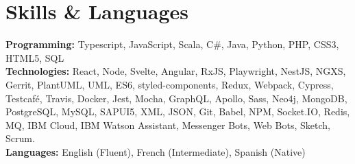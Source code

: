\documentclass[letterpaper,11pt]{article}
\newcommand{\resumeSubHeadingListStart}{\begin{itemize}[leftmargin=0.15pt, label={}]}
\newcommand{\resumeSubHeadingListEnd}{\end{itemize}}
\begin{document}
\section{Skills \& Languages}
  \vspace{2pt}
  \resumeSubHeadingListStart
    \small{\item{
        \textbf{Programming:}{ Typescript, JavaScript, Scala, C\#, Java, Python, PHP, CSS3, HTML5, SQL} \\ \vspace{3pt}
        \textbf{Technologies:}{ React, Node, Svelte, Angular, RxJS, Playwright, NestJS, NGXS, Gerrit, PlantUML, UML, ES6,
        styled-components, Redux, Webpack, Cypress, Testcafé, Travis, Docker, Jest, Mocha, GraphQL, Apollo, Sass,
        Neo4j, MongoDB, PostgreSQL, MySQL, SAPUI5, XML, JSON, Git, Babel, NPM, Socket.IO, Redis, MQ, IBM Cloud, IBM
        Watson Assistant, Messenger Bots, Web Bots, Sketch, Scrum. } \\ \vspace{3pt}
        \textbf{Languages:}{ English (Fluent), French (Intermediate), Spanish (Native)}
        
    }}
  \resumeSubHeadingListEnd
\end{document}
